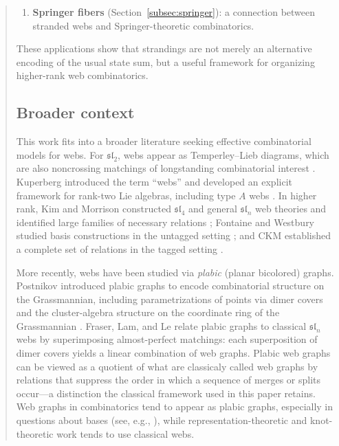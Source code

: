 \documentclass[letterpaper,11pt]{amsart}
\begin{document}
\begin{abstract}
\begin{enumerate}
    \item \textbf{Springer fibers} (Section~\ref{subsec:springer}): a connection between stranded webs and Springer-theoretic combinatorics.
 
\end{enumerate}
 
These applications show that strandings are not merely an alternative encoding of the usual state sum, but a useful framework for organizing higher-rank web combinatorics.
 
\subsection*{Broader context}
 
This work fits into a broader literature seeking effective combinatorial models for webs. For $\mathfrak{sl}_2$, webs appear as Temperley--Lieb diagrams, which are also noncrossing matchings of longstanding combinatorial interest \cite{RumerTellerWeyl, TemperleyLieb}. Kuperberg introduced the term ``webs'' and developed an explicit framework for rank-two Lie algebras, including type $A$ webs \cite{KuperbergWebs}. In higher rank, Kim and Morrison constructed $\mathfrak{sl}_4$ and general $\mathfrak{sl}_n$ web theories and identified large families of necessary relations \cite{Kim, MorrisonThesis}; Fontaine and Westbury studied basis constructions in the untagged setting \cite{FON, WestburyBases}; and CKM established a complete set of relations in the tagged setting \cite[Theorem 3.3.1]{CKM}.
 
More recently, webs have been studied via \emph{plabic} (planar bicolored) graphs. Postnikov introduced plabic graphs to encode combinatorial structure on the Grassmannian, including parametrizations of points via dimer covers \cite{Postnikov, PostnikovSW2009} and the cluster-algebra structure on the coordinate ring of the Grassmannian \cite{FP}. Fraser, Lam, and Le \cite{FraserLamLe} relate plabic graphs to classical $\mathfrak{sl}_n$ webs by superimposing almost-perfect matchings: each superposition of dimer covers yields a linear combination of web graphs. Plabic web graphs can be viewed as a quotient of what are classicaly called web graphs by relations that suppress the order in which a sequence of merges or splits occur---a distinction the classical framework used in this paper retains. Web graphs in combinatorics tend to appear as plabic graphs, especially in questions about bases 
(see, e.g., \cite{GaetzetalRotation}), while representation-theoretic and knot-theoretic work tends to use classical webs.
 

\end{abstract}
\end{document}
